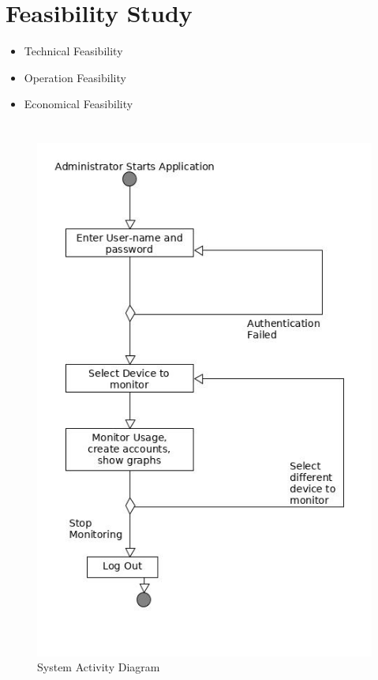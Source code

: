 \documentclass[10pt,article,oneside]{memoir}
\begin{document}
\chapter*{Feasibility Study}
\label{sec:orge94f51f}
\begin{itemize}
\item Technical Feasibility
\item Operation Feasibility
\item Economical Feasibility
\end{itemize}

\chapter*{}
\label{sec:orge616a54}
\begin{figure}[htbp]
\centering
\includegraphics[width=.9\linewidth]{./diagrams/activity.jpg}
\caption{System Activity Diagram}
\end{figure}
\end{document}
